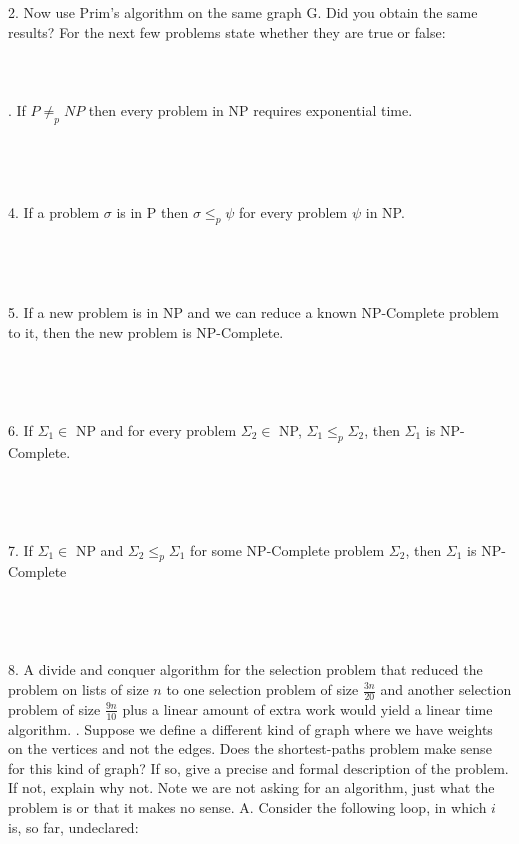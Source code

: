 \documentclass[12pt]{article}
\begin{document}
2. Now use Prim's algorithm on the same graph G. Did you obtain the same results?
\newpage
\noindent For the next few problems state whether they are true or false:\\\\\\\\
. If $P \ne_p NP$ then every problem in NP requires exponential time.\\\\\\\\\\
4. If a problem $\sigma$ is in P then $\sigma \le_p \psi$ for every problem $\psi$ in NP.\\\\\\\\\\
5. If a new problem is in NP and we can reduce a known NP-Complete problem to it, then the 
new problem is NP-Complete.\\\\\\\\\\
6. If $\Sigma_1\in$ NP and for every problem $\Sigma_2\in$ NP, $\Sigma_1 \le_p \Sigma_2$,
then  $\Sigma_1$ is NP-Complete.\\\\\\\\\\
7. If $\Sigma_1\in$ NP and $\Sigma_2 \le_p \Sigma_1$ for some NP-Complete problem 
$\Sigma_2$, then $\Sigma_1$ is NP-Complete\\\\\\\\\\
8. A divide and conquer algorithm for the selection problem that reduced the problem on
lists of size $n$ to one selection problem of size $\frac{3n}{20}$ and another selection problem of
size $\frac{9n}{10}$ plus a linear amount of extra work would yield a linear time algorithm.
\newpage
{}. Suppose we define a different kind of graph where we have weights on the vertices and not the edges.
Does the shortest-paths problem make sense for this kind of graph? If so, give a precise and formal
description of the problem. If not, explain why not. Note we are not asking for an algorithm, just what
the problem is or that it makes no sense.
\newpage
\noindent 
A. Consider the following loop, in which $i$ is, so far, undeclared:\\
\end{document}
